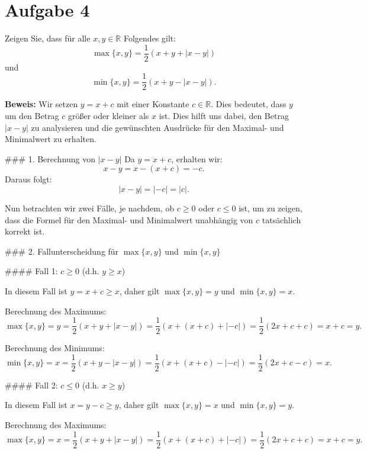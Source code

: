 \documentclass[11pt]{article}
\begin{document}
   \section*{Aufgabe 4}
Zeigen Sie, dass für alle \( x, y \in \mathbb{R} \) Folgendes gilt:
\[
\max\{x, y\} = \frac{1}{2} (x + y + |x - y|)
\]
und
\[
\min\{x, y\} = \frac{1}{2} (x + y - |x - y|).
\]

\textbf{Beweis:} Wir setzen \( y = x + c \) mit einer Konstante \( c \in \mathbb{R} \). Dies bedeutet, dass \( y \) um den Betrag \( c \) größer oder kleiner als \( x \) ist. Dies hilft uns dabei, den Betrag \( |x - y| \) zu analysieren und die gewünschten Ausdrücke für den Maximal- und Minimalwert zu erhalten.

### 1. Berechnung von \( |x - y| \)
Da \( y = x + c \), erhalten wir:
\[
x - y = x - (x + c) = -c.
\]
Daraus folgt:
\[
|x - y| = | - c | = |c|.
\]

Nun betrachten wir zwei Fälle, je nachdem, ob \( c \geq 0 \) oder \( c \leq 0 \) ist, um zu zeigen, dass die Formel für den Maximal- und Minimalwert unabhängig von \( c \) tatsächlich korrekt ist.

### 2. Fallunterscheidung für \( \max\{x, y\} \) und \( \min\{x, y\} \)

#### Fall 1: \( c \geq 0 \) (d.h. \( y \geq x \))

In diesem Fall ist \( y = x + c \geq x \), daher gilt \( \max\{x, y\} = y \) und \( \min\{x, y\} = x \).

Berechnung des Maximums:
\[
\max\{x, y\} = y = \frac{1}{2} (x + y + |x - y|) = \frac{1}{2} (x + (x + c) + | - c |) = \frac{1}{2} (2x + c + c) = x + c = y.
\]

Berechnung des Minimums:
\[
\min\{x, y\} = x = \frac{1}{2} (x + y - |x - y|) = \frac{1}{2} (x + (x + c) - | - c |) = \frac{1}{2} (2x + c - c) = x.
\]

#### Fall 2: \( c \leq 0 \) (d.h. \( x \geq y \))

In diesem Fall ist \( x = y - c \geq y \), daher gilt \( \max\{x, y\} = x \) und \( \min\{x, y\} = y \).

Berechnung des Maximums:
\[
\max\{x, y\} = x = \frac{1}{2} (x + y + |x - y|) = \frac{1}{2} (x + (x + c) + | - c |) = \frac{1}{2} (2x + c + c) = x + c = y.
\]
\end{document}
